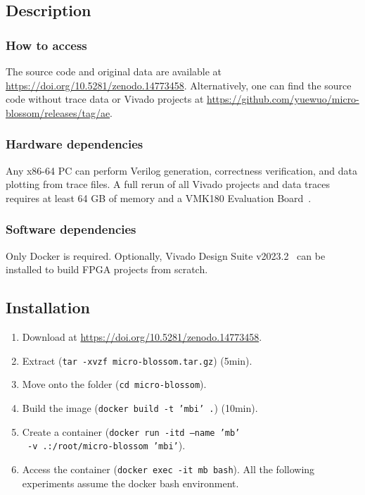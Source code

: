 \subsection{Description}

\subsubsection{How to access}

The source code and original data are available at {\url{https://doi.org/10.5281/zenodo.14773458}}.
Alternatively, one can find the source code without trace data or Vivado projects at {\url{https://github.com/yuewuo/micro-blossom/releases/tag/ae}}.

\subsubsection{Hardware dependencies}

Any x86-64 PC can perform Verilog generation, correctness verification, and data plotting from trace files.
A full rerun of all Vivado projects and data traces requires at least 64 GB of memory and a VMK180 Evaluation Board~\cite{vmk180}.

\subsubsection{Software dependencies}

Only Docker is required.
Optionally, Vivado Design Suite v2023.2~\cite{vivado2023} can be installed to build FPGA projects from scratch.

\subsection{Installation}

\begin{enumerate}
    \item Download at {\url{https://doi.org/10.5281/zenodo.14773458}}.
    \item Extract (\texttt{tar -xvzf micro-blossom.tar.gz}) (5min).
    \item Move onto the folder (\texttt{cd micro-blossom}).
    \item Build the image (\texttt{docker build -t 'mbi' .}) (10min).
    \item Create a container (\texttt{docker run -itd --name 'mb'}\\\texttt{ -v .:/root/micro-blossom 'mbi'}).
    \item Access the container (\texttt{docker exec -it mb bash}). All the following experiments assume the docker bash environment.
\end{enumerate}

